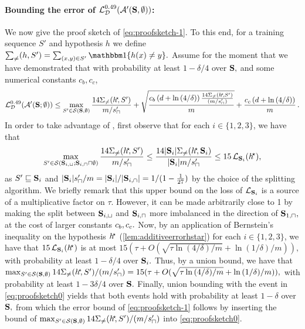 {}

\paragraph{Bounding the error of $ \operatorname{\mathcal{L}}_{\mathcal{D}}^{0.49}(\mathcal{A}'(\mathbf{S},\emptyset)) $:}
We now give the proof sketch of \cref{eq:proofsketch-1}. 
To this end, for a training sequence $ S' $ and  hypothesis $ h$ we define $\sum_{\not=}(h,S')  =\sum_{(x,y)\in S'}\ind\{h(x)\not=y\}.$ 
Assume for the moment that we have demonstrated that with probability at least $ 1-\delta/4 $ over $ \mathbf{S}, $ and some numerical constants $c_b, c_c$,
\begin{align}\label{eq:proofsketch0}
    \operatorname{\mathcal{L}}_{\mathcal{D}}^{0.49}(\mathcal{A}'(\mathbf{S};\emptyset))
    \leq  \max\limits_{S'\in\mathcal{S}(\mathbf{S},\emptyset)} \frac{14\Sigma_{\not=}(h^{\negmedspace\star}\negmedspace,S')}{m/s_{\sqcap}'}+\sqrt{\frac{c_b\left(d+\ln{(4/\delta )}\right)\frac{14\Sigma_{\not=}(h^{\negmedspace\star}\negmedspace,S')}{(m/s_{\sqcap}')}}{m}}+\frac{c_c\left(d+\ln{(4/\delta )}\right)}{m} \,.
\end{align}
In order to take advantage of , first observe that for each $ i\in\{  1,2,3\}  $, we have that 
\[ \max_{S'\in\mathcal{S}(\mathbf{S}_{i,\sqcup};\mathbf{S}_{i,\sqcap}\sqcap\emptyset)}\frac{14\Sigma_{\not=}(h^{\negmedspace\star}\negmedspace,S')}{m/s_{\sqcap}'} \leq \frac{14|\mathbf{S}_{i}|\Sigma_{\not=}(h^{\negmedspace\star}\negmedspace,\mathbf{S}_{i})}{|\mathbf{S}_{i}|m/s_{\sqcap}'} \leq 15\operatorname{\mathcal{L}}_{\mathbf{S}_{i}}(h^{\negmedspace\star}), \]
as $ S'\sqsubseteq \mathbf{S}_{i}$ and $ |\mathbf{S}_{i}|s_{\sqcap}'/m=|\mathbf{S}_{i}|/|\mathbf{S}_{i,\cap}|=1/(1-\frac{1}{27}) $ by the choice of the splitting algorithm. 
We briefly remark that this upper bound on the loss of $ \operatorname{\mathcal{L}}_{\mathbf{S}_{i}}$ is a source of a multiplicative factor on $ \tau$. However, it can be made arbitrarily close to 1 by making the split between $ \mathbf{S}_{i,\sqcup} $ and $ \mathbf{S}_{i,\sqcap} $ more imbalanced in the direction of $ \mathbf{S}_{1,\sqcap},$ at the cost of larger constants $ c_b, c_c.$
Now, by an application of Bernstein's inequality on the hypothesis $ h^{\negmedspace\star}$ (\cref{lem:additiveerrorhstar})
for each $ i\in\{ 1,2,3 \}  $, we have that $ 15\operatorname{\mathcal{L}}_{\mathbf{S}_{i}}(h^{\negmedspace\star}) $ is at most  $ 15(\tau+O(\sqrt{\tau\ln{\left(4/\delta \right)}/m}+\ln{\left(1/\delta \right)}/m)),$ with probability at least $ 1-\delta/4$ over $ \mathbf{S}_{i}.$
Thus, by a union bound, we have that  $ \max_{S'\in\mathcal{S}(\mathbf{S},\emptyset)}14\Sigma_{\not=}(h^{\negmedspace\star}\negmedspace,S')/(m/s_{\sqcap}')=15(\tau+O(\sqrt{\tau\ln{\left(4/\delta \right)}/m}+\ln{\left(1/\delta \right)}/m)),$ with probability at least $ 1- 3\delta/4$ over $ \mathbf{S}.$ 
Finally, union bounding with the event in \cref{eq:proofsketch0} yields that both events hold with probability at least $ 1-\delta $ over $ \mathbf{S},$ from which the error bound of \cref{eq:proofsketch-1} follows by inserting the bound of $ \max_{S'\in\mathcal{S}(\mathbf{S},\emptyset)}14\Sigma_{\not=}(h^{\negmedspace\star}\negmedspace,S')/(m/s_{\sqcap}') $ into \cref{eq:proofsketch0}.    

